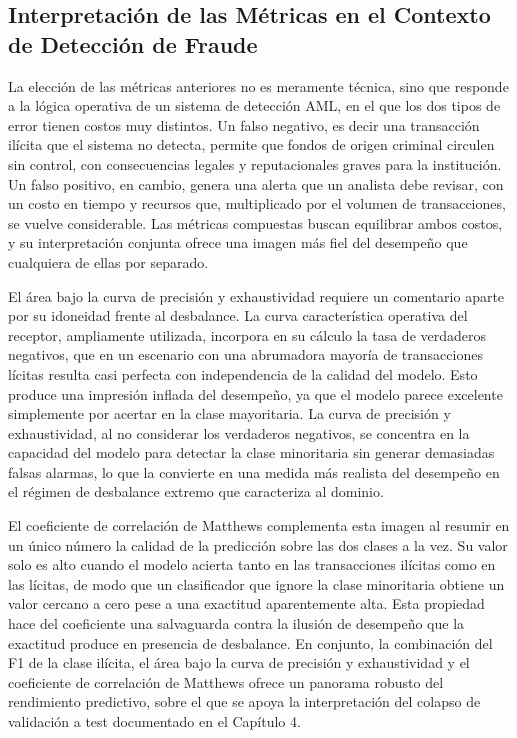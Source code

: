 \subsection{Interpretación de las Métricas en el Contexto de Detección de Fraude}

La elección de las métricas anteriores no es meramente técnica, sino que responde a la lógica operativa de un sistema de detección AML, en el que los dos tipos de error tienen costos muy distintos. Un falso negativo, es decir una transacción ilícita que el sistema no detecta, permite que fondos de origen criminal circulen sin control, con consecuencias legales y reputacionales graves para la institución. Un falso positivo, en cambio, genera una alerta que un analista debe revisar, con un costo en tiempo y recursos que, multiplicado por el volumen de transacciones, se vuelve considerable. Las métricas compuestas buscan equilibrar ambos costos, y su interpretación conjunta ofrece una imagen más fiel del desempeño que cualquiera de ellas por separado.

El área bajo la curva de precisión y exhaustividad requiere un comentario aparte por su idoneidad frente al desbalance. La curva característica operativa del receptor, ampliamente utilizada, incorpora en su cálculo la tasa de verdaderos negativos, que en un escenario con una abrumadora mayoría de transacciones lícitas resulta casi perfecta con independencia de la calidad del modelo. Esto produce una impresión inflada del desempeño, ya que el modelo parece excelente simplemente por acertar en la clase mayoritaria. La curva de precisión y exhaustividad, al no considerar los verdaderos negativos, se concentra en la capacidad del modelo para detectar la clase minoritaria sin generar demasiadas falsas alarmas, lo que la convierte en una medida más realista del desempeño en el régimen de desbalance extremo que caracteriza al dominio.

El coeficiente de correlación de Matthews complementa esta imagen al resumir en un único número la calidad de la predicción sobre las dos clases a la vez. Su valor solo es alto cuando el modelo acierta tanto en las transacciones ilícitas como en las lícitas, de modo que un clasificador que ignore la clase minoritaria obtiene un valor cercano a cero pese a una exactitud aparentemente alta. Esta propiedad hace del coeficiente una salvaguarda contra la ilusión de desempeño que la exactitud produce en presencia de desbalance. En conjunto, la combinación del F1 de la clase ilícita, el área bajo la curva de precisión y exhaustividad y el coeficiente de correlación de Matthews ofrece un panorama robusto del rendimiento predictivo, sobre el que se apoya la interpretación del colapso de validación a test documentado en el Capítulo 4.

